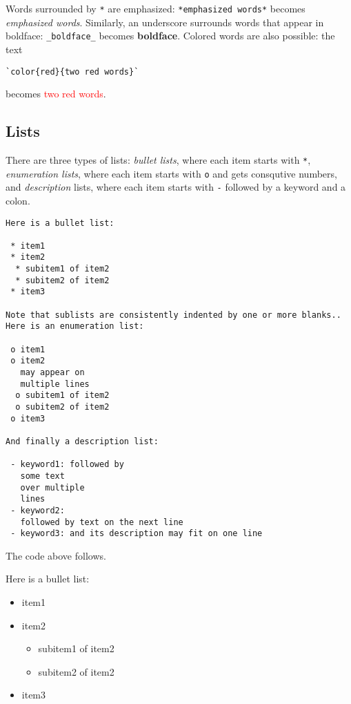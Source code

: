 \documentclass[%
oneside,                 %
final,                   %
10pt]{article}
\begin{document}
Words surrounded by \Verb!*! are emphasized: \Verb!*emphasized words*! becomes
\emph{emphasized words}. Similarly, an underscore surrounds words that
appear in boldface: \Verb!_boldface_! becomes \textbf{boldface}. Colored words
are also possible: the text
\begin{Verbatim}[numbers=none,fontsize=\fontsize{9pt}{9pt},baselinestretch=0.85,xleftmargin=0mm]
`color{red}{two red words}`
\end{Verbatim}
becomes \textcolor{red}{two red words}.

\subsection{Lists}

There are three types of lists: \emph{bullet lists}, where each item starts
with \Verb!*!, \emph{enumeration lists}, where each item starts with \Verb!o! and gets
consqutive numbers,
and \emph{description} lists, where each item starts with \Verb!-! followed
by a keyword and a colon.
\begin{Verbatim}[numbers=none,fontsize=\fontsize{9pt}{9pt},baselinestretch=0.85,xleftmargin=0mm]
Here is a bullet list:

 * item1
 * item2
  * subitem1 of item2
  * subitem2 of item2
 * item3

Note that sublists are consistently indented by one or more blanks..
Here is an enumeration list:

 o item1
 o item2
   may appear on
   multiple lines
  o subitem1 of item2
  o subitem2 of item2
 o item3

And finally a description list:

 - keyword1: followed by
   some text
   over multiple
   lines
 - keyword2:
   followed by text on the next line
 - keyword3: and its description may fit on one line
\end{Verbatim}
The code above follows.

Here is a bullet list:

\begin{itemize}
 \item item1

 \item item2
\begin{itemize}

  \item subitem1 of item2

  \item subitem2 of item2

\end{itemize}

\noindent
 \item item3
\end{itemize}
\end{document}
